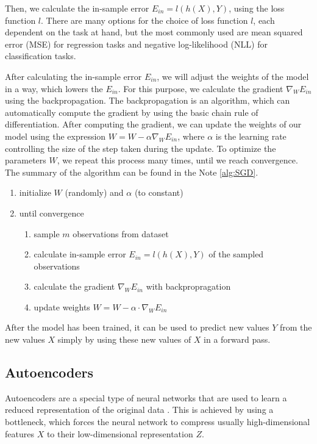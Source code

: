 Then, we calculate the in-sample error $E_{in} = l(h(X), Y)$, using the loss function $l$.
There are many options for the choice of loss function $l$, each dependent on the task at hand, but the most commonly used are mean squared error (MSE) for regression tasks and negative log-likelihood (NLL) for classification tasks.

After calculating the in-sample error $E_{in}$, we will adjust the weights of the model in a way, which lowers the $E_{in}$.
For this purpose, we calculate the gradient $\nabla_W E_{in}$ using the backpropagation.
The backpropagation is an algorithm, which can automatically compute the gradient by using the basic chain rule of differentiation.
After computing the gradient, we can update the weights of our model using the expression $W = W - \alpha \nabla_W E_{in}$, where $\alpha$ is the learning rate controlling the size of the step taken during the update.
To optimize the parameters $W$, we repeat this process many times, until we reach convergence.
The summary of the algorithm can be found in the Note \ref{alg:SGD}.

\begin{enumerate}
    \item initialize $W$ (randomly) and $\alpha$ (to constant)
    \item until convergence
    \begin{enumerate}
        \item sample $m$ observations from dataset
        \item calculate in-sample error $E_{in} = l(h(X), Y)$ of the sampled observations
        \item calculate the gradient $\nabla_W E_{in}$ with backpropragation
        \item update weights $W = W - \alpha \cdot \nabla_W E_{in}$
    \end{enumerate}
    \label{alg:SGD}
\end{enumerate}

After the model has been trained, it can be used to predict new values $Y$ from the new values $X$ simply by using these new values of $X$ in a forward pass.

\subsection{Autoencoders}
Autoencoders are a special type of neural networks that are used to learn a reduced representation of the original data \cite{lauzon2012introduction}.
This is achieved by using a bottleneck, which forces the neural network to compress usually high-dimensional features $X$ to their low-dimensional representation $Z$.

